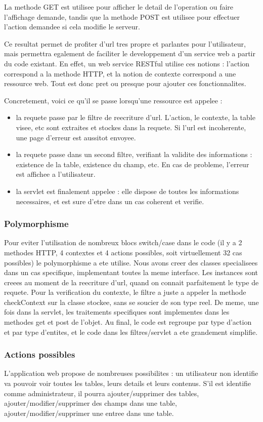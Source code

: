 La methode GET est utilisee pour afficher le detail de l'operation ou faire l'affichage demande, tandis que la methode POST est utilisee pour effectuer l'action demandee si cela modifie le serveur.

Ce resultat permet de profiter d'url tres propre et parlantes pour l'utilisateur, mais permettra egalement de faciliter le developpement d'un service web a partir du code existant. En effet, un web service RESTful utilise ces notions : l'action correspond a la methode HTTP, et la notion de contexte correspond a une ressource web. Tout est donc pret ou presque pour ajouter ces fonctionnalites.

Concretement, voici ce qu'il se passe lorsqu'une ressource est appelee :
\begin{itemize}
	\item la requete passe par le filtre de reecriture d'url. L'action, le contexte, la table visee, etc sont extraites et stockes dans la requete. Si l'url est incoherente, une page d'erreur est aussitot envoyee.
	\item la requete passe dans un second filtre, verifiant la validite des informations : existence de la table, existence du champ, etc. En cas de probleme, l'erreur est affichee a l'utilisateur.
	\item la servlet est finalement appelee : elle dispose de toutes les informations necessaires, et est sure d'etre dans un cas coherent et verifie.
\end{itemize}

\subsubsection{Polymorphisme}
Pour eviter l'utilisation de nombreux blocs switch/case dans le code (il y a 2 methodes HTTP, 4 contextes et 4 actions possibles, soit virtuellement 32 cas possibles) le polymorphisme a ete utilise. Nous avons creer des classes specialisees dans un cas specifique, implementant toutes la meme interface. Les instances sont creees au moment de la reecriture d'url, quand on connait parfaitement le type de requete. Pour la verification du contexte, le filtre a juste a appeler la methode checkContext sur la classe stockee, sans se soucier de son type reel. De meme, une fois dans la servlet, les traitements specifiques sont implementes dans les methodes get et post de l'objet. Au final, le code est regroupe par type d'action et par type d'entites, et le code dans les filtres/servlet a ete grandement simplifie.

\subsubsection{Actions possibles}
L'application web propose de nombreuses possibilites : un utilisateur non identifie va pouvoir voir toutes les tables, leurs details et leurs contenus.
S'il est identifie comme administrateur, il pourra ajouter/supprimer des tables, ajouter/modifier/supprimer des champs dans une table, ajouter/modifier/supprimer une entree dans une table.
